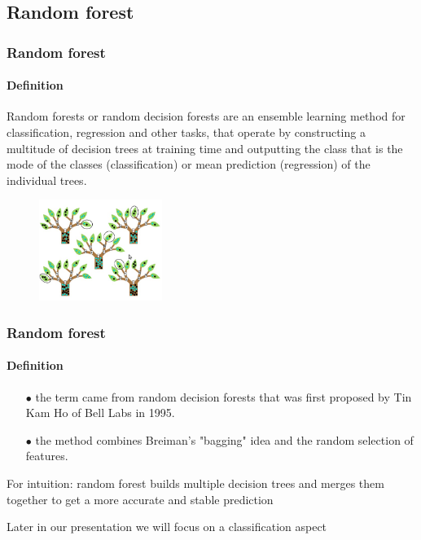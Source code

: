 \subsection{Random forest} %

\begin{frame}
	\frametitle{Random forest}
		\framesubtitle{Definition}

	\begin{block}{}
		Random forests or random decision forests are an ensemble learning method for classification, regression and other tasks, that operate by constructing a multitude of decision trees at training time and outputting the class that is the mode of the classes (classification) or mean prediction (regression) of the individual trees.
	\end{block}

	\vfill
	
	\begin{figure}
		\includegraphics[width=4cm]{./figures/las}
	\end{figure}

\end{frame}

\begin{frame}
	\frametitle{Random forest}
		\framesubtitle{Definition}

		\begin{itemize}
		  \item[$\bullet$]  the term came from random decision forests that was first proposed by Tin Kam Ho of Bell Labs in 1995.
		  \item[$\bullet$] the method combines Breiman's "bagging" idea and the random selection of features.
		\end{itemize}
		
		\vfill
		
		For intuition:
		random forest builds multiple decision trees and merges them together to get a more accurate and stable prediction

		\vfill

		\tiny Later in our presentation we will focus on a classification aspect

\end{frame}

